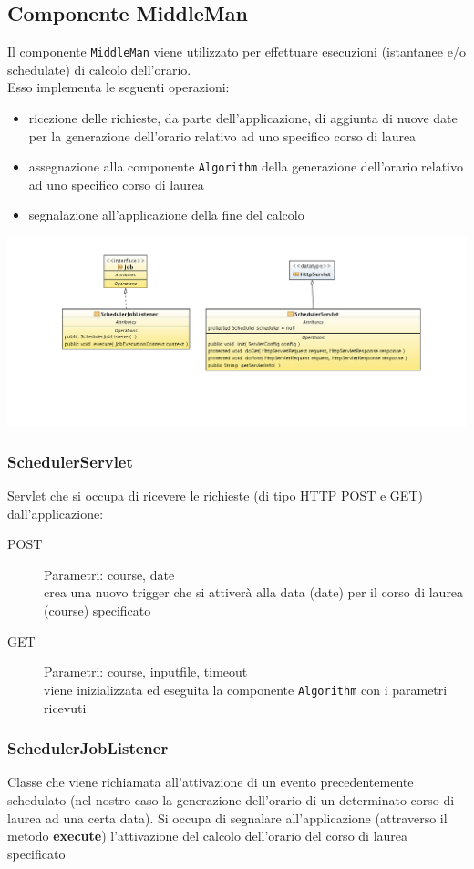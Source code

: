 \documentclass[11pt,a4paper]{article}
\begin{document}
\subsection{Componente MiddleMan}
Il componente \verb|MiddleMan| viene utilizzato per effettuare esecuzioni (istantanee e/o schedulate) di calcolo dell'orario. \\ 
Esso implementa le seguenti operazioni:
\begin{itemize}
\item ricezione delle richieste, da parte dell'applicazione, di aggiunta di nuove date per la generazione dell'orario relativo ad uno specifico corso di laurea
\item assegnazione alla componente \verb|Algorithm| della generazione dell'orario relativo ad uno specifico corso di laurea
\item segnalazione all'applicazione della fine del calcolo 
\end{itemize}
\includegraphics[scale=0.34]{images/MMserv_diagram_class.png}
\subsubsection{SchedulerServlet}
Servlet che si occupa di ricevere le richieste (di tipo HTTP POST e GET) dall'applicazione:
\begin{description}
\item[POST]
Parametri: course, date\\
crea una nuovo trigger che si attiverà alla data (date) per il corso di laurea (course) specificato 
\item[GET]
Parametri: course, inputfile, timeout\\
viene inizializzata ed eseguita la componente \verb|Algorithm| con i parametri ricevuti
\end{description}
\subsubsection{SchedulerJobListener}
Classe che viene richiamata all'attivazione di un evento precedentemente schedulato (nel nostro caso la generazione dell'orario di un determinato corso di laurea ad una certa data).
Si occupa di segnalare all'applicazione (attraverso il metodo \textbf{execute}) l'attivazione del calcolo dell'orario del corso di laurea specificato  
\end{document}
